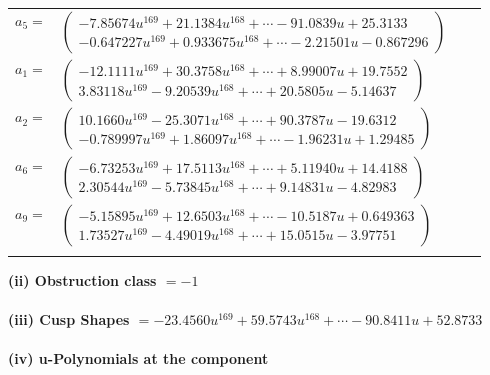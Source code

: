 \documentclass[1p]{elsarticle_modified}
\theoremstyle{definition}
\begin{document}
\begin{tabular}{m{7pt} m{180pt} m{7pt} m{180pt} }
\flushright $a_{5}=$&$\begin{pmatrix}-7.85674 u^{169}+21.1384 u^{168}+\cdots-91.0839 u+25.3133\\-0.647227 u^{169}+0.933675 u^{168}+\cdots-2.21501 u-0.867296\end{pmatrix}$ \\
\flushright $a_{1}=$&$\begin{pmatrix}-12.1111 u^{169}+30.3758 u^{168}+\cdots+8.99007 u+19.7552\\3.83118 u^{169}-9.20539 u^{168}+\cdots+20.5805 u-5.14637\end{pmatrix}$ \\
\flushright $a_{2}=$&$\begin{pmatrix}10.1660 u^{169}-25.3071 u^{168}+\cdots+90.3787 u-19.6312\\-0.789997 u^{169}+1.86097 u^{168}+\cdots-1.96231 u+1.29485\end{pmatrix}$ \\
\flushright $a_{6}=$&$\begin{pmatrix}-6.73253 u^{169}+17.5113 u^{168}+\cdots+5.11940 u+14.4188\\2.30544 u^{169}-5.73845 u^{168}+\cdots+9.14831 u-4.82983\end{pmatrix}$ \\
\flushright $a_{9}=$&$\begin{pmatrix}-5.15895 u^{169}+12.6503 u^{168}+\cdots-10.5187 u+0.649363\\1.73527 u^{169}-4.49019 u^{168}+\cdots+15.0515 u-3.97751\end{pmatrix}$\\&\end{tabular}
\flushleft \textbf{(ii) Obstruction class $= -1$}\\~\\
\flushleft \textbf{(iii) Cusp Shapes $= -23.4560 u^{169}+59.5743 u^{168}+\cdots-90.8411 u+52.8733$}\\~\\
\newpage\renewcommand{\arraystretch}{1}
\flushleft \textbf{(iv) u-Polynomials at the component}\newline \\
\end{document}
